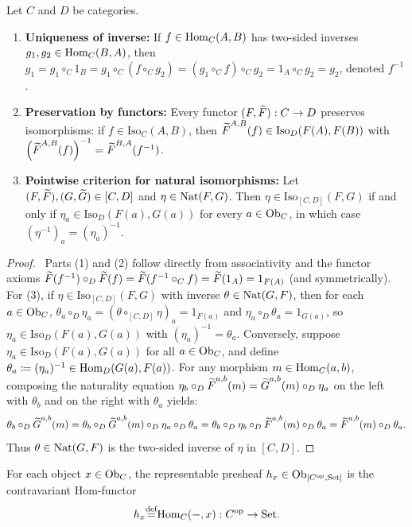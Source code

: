 \documentclass[10pt,a4paper]{article}
\renewcommand{\myprf}{\begin{proof}}
\renewcommand{\myqed}{\end{proof}}
\begin{document}
\begin{theorem}\label{thm:nat_iso}
Let $C$ and $D$ be categories.
\begin{enumerate}
\item \textbf{Uniqueness of inverse:} If $f \in {\textrm{Hom}}_C(A,B)$ has two-sided inverses $g_1, g_2 \in {\textrm{Hom}}_C(B,A)$, then $g_1 = g_1 \circ_C 1_B = g_1 \circ_C (f \circ_C g_2) = (g_1 \circ_C f) \circ_C g_2 = 1_A \circ_C g_2 = g_2$, denoted $f^{-1}$.
\item \textbf{Preservation by functors:} Every functor $(F, {\widetilde{F}\textrm{}}) : C \to D$ preserves isomorphisms: if $f \in \mathrm{Iso}_C(A,B)$, then ${\widetilde{F}\textrm{}}^{A,B}(f) \in \mathrm{Iso}_D(F(A), F(B))$ with $\left({\widetilde{F}\textrm{}}^{A,B}(f)\right)^{-1} = {\widetilde{F}\textrm{}}^{B,A}(f^{-1})$.
\item \textbf{Pointwise criterion for natural isomorphisms:} Let $(F, {\widetilde{F}\textrm{}}), (G, {\widetilde{G}\textrm{}}) \in [C, D]$ and $\eta \in {\textrm{Nat}}(F, G)$. Then $\eta \in \mathrm{Iso}_{[C,D]}(F, G)$ if and only if $\eta_a \in \mathrm{Iso}_D(F(a), G(a))$ for every $a \in {\textrm{Ob}}_C$, in which case $(\eta^{-1})_a = (\eta_a)^{-1}$.
\end{enumerate}
\end{theorem}
\myprf\ Parts (1) and (2) follow directly from associativity and the functor axioms ${\widetilde{F}\textrm{}}(f^{-1}) \circ_D {\widetilde{F}\textrm{}}(f) = {\widetilde{F}\textrm{}}(f^{-1} \circ_C f) = {\widetilde{F}\textrm{}}(1_A) = 1_{F(A)}$ (and symmetrically). For (3), if $\eta \in \mathrm{Iso}_{[C,D]}(F, G)$ with inverse $\theta \in {\textrm{Nat}}(G, F)$, then for each $a \in {\textrm{Ob}}_C$, $\theta_a \circ_D \eta_a = (\theta \circ_{[C,D]} \eta)_a = 1_{F(a)}$ and $\eta_a \circ_D \theta_a = 1_{G(a)}$, so $\eta_a \in \mathrm{Iso}_D(F(a), G(a))$ with $(\eta_a)^{-1} = \theta_a$. Conversely, suppose $\eta_a \in \mathrm{Iso}_D(F(a), G(a))$ for all $a \in {\textrm{Ob}}_C$, and define $\theta_a \coloneqq (\eta_a)^{-1} \in {\textrm{Hom}}_D(G(a), F(a))$. For any morphism $m \in {\textrm{Hom}}_C(a,b)$, composing the naturality equation $\eta_b \circ_D {\widetilde{F}\textrm{}}^{a,b}(m) = {\widetilde{G}\textrm{}}^{a,b}(m) \circ_D \eta_a$ on the left with $\theta_b$ and on the right with $\theta_a$ yields:
$$\theta_b \circ_D {\widetilde{G}\textrm{}}^{a,b}(m) = \theta_b \circ_D {\widetilde{G}\textrm{}}^{a,b}(m) \circ_D \eta_a \circ_D \theta_a = \theta_b \circ_D \eta_b \circ_D {\widetilde{F}\textrm{}}^{a,b}(m) \circ_D \theta_a = {\widetilde{F}\textrm{}}^{a,b}(m) \circ_D \theta_a.$$
Thus $\theta \in {\textrm{Nat}}(G, F)$ is the two-sided inverse of $\eta$ in $[C, D]$. \myqed

\begin{definition}
For each object $x \in {\textrm{Ob}}_C$, the representable presheaf $h_x \in {\textrm{Ob}}_{[C^{\textrm{op}},{\textrm{Set}}]}$ is the contravariant Hom-functor
$$h_x {\stackrel{{\textrm{def}}}{=}} {\textrm{Hom}}_C(-, x) : C^{\textrm{op}} \to {\textrm{Set}}.$$
\end{definition}
\end{document}
